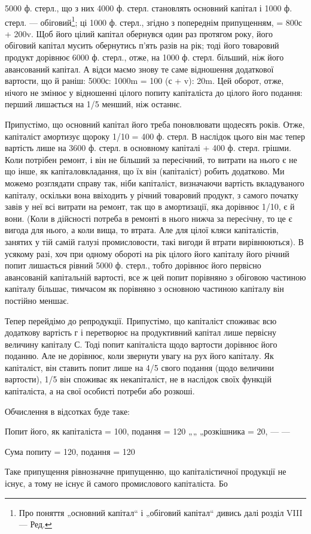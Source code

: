 5000 ф. стерл., що з них 4000 ф. стерл. становлять основний капітал і
1000 ф. стерл. — обіговий\footnote*{
Про поняття „основний капітал“ і „обіговий капітал“ дивись далі розділ
VIII — Ред.
}; ці 1000 ф. стерл., згідно з попереднім
припущенням, = 800с + 200v. Щоб його цілий капітал обернувся
один раз протягом року, його обіговий капітал мусить обернутись п’ять
разів на рік; тоді його товаровий продукт дорівнює 6000 ф. стерл.,
отже, на 1000 ф. стерл. більший, ніж його авансований капітал. А відси
маємо знову те саме відношення додаткової вартости, що й раніш:
5000с: 1000m = 100 (с + v): 20m. Цей оборот, отже, нічого не
змінює у відношенні цілого попиту капіталіста до цілого його подання:
перший лишається на 1/5 менший, ніж останнє.

Припустімо, що основний капітал його треба поновлювати щодесять
років. Отже, капіталіст амортизує щороку 1/10 = 400 ф. стерл. В наслідок
цього він має тепер вартість лише на 3600 ф. стерл. в основному капіталі
+ 400 ф. стерл. грішми. Коли потрібен ремонт, і він не більший за
пересічний, то витрати на нього є не що інше, як капіталовкладання, що
їх він (капіталіст) робить додатково. Ми можемо розглядати справу так,
ніби капіталіст, визначаючи вартість вкладуваного капіталу, оскільки
вона ввіходить у річний товаровий продукт, з самого початку завів у
неї всі витрати на ремонт, так що в амортизації, яка дорівнює 1/10,
є й вони. (Коли в дійсності потреба в ремонті в нього нижча
за пересічну, то це є вигода для нього, а коли вища, то втрата. Але
для цілої кляси капіталістів, занятих у тій самій галузі промисловости,
такі вигоди й втрати вирівнюються). В усякому разі, хоч при одному
обороті на рік цілого його капіталу його річний попит лишається рівний
5000 ф. стерл., тобто дорівнює його первісно авансованій капітальній
вартості, все ж цей попит порівняно з обіговою частиною капіталу
більшає, тимчасом як порівняно з основною частиною капіталу він постійно
меншає.

Тепер перейдімо до репродукції. Припустімо, що капіталіст споживає
всю додаткову вартість г і перетворює на продуктивний капітал лише
первісну величину капіталу С. Тоді попит капіталіста щодо вартости
дорівнює його поданню. Але не дорівнює, коли звернути увагу на рух
його капіталу. Як капіталіст, він ставить попит лише на 4/5 свого подання
(щодо величини вартости), 1/5 він споживає як некапіталіст, не
в наслідок своїх функцій капіталіста, а на свої особисті потреби або
розкоші.

Обчислення в відсотках буде таке:

Попит його, як капіталіста = 100, подання = 120
    „„       „розкішника = 20, — —

            Сума попиту = 120, подання = 120

Таке припущення рівнозначне припущенню, що капіталістичної продукції
не існує, а тому не існує й самого промислового капіталіста. Бо